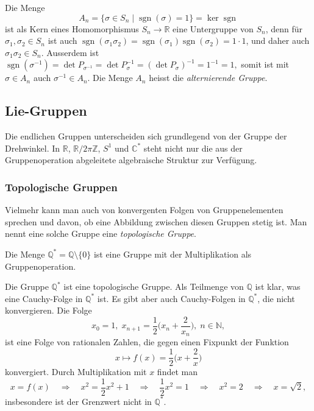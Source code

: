 Die Menge
\[
A_n
=
\{ \sigma\in S_n \mid \operatorname{sgn}(\sigma) = 1 \}
=
\ker
\operatorname{sgn}
\]
ist als Kern eines Homomorphismus $S_n\to\mathbb{R}$
eine Untergruppe von $S_n$, denn für $\sigma_1,\sigma_2\in S_n$ ist auch
\(
\operatorname{sgn}(\sigma_1\sigma_2)
=
\operatorname{sgn}(\sigma_1)
\operatorname{sgn}(\sigma_2)
=
1\cdot 1
\),
und daher auch $\sigma_1\sigma_2\in S_n$.
Ausserdem ist 
\(
\operatorname{sgn}(\sigma^{-1})=\det P_{\sigma^{-1}}
=
\det P_\sigma^{-1}
=
(\det P_\sigma)^{-1}
=
1^{-1}=1,
\)
somit ist mit $\sigma\in A_n$ auch $\sigma^{-1}\in A_n$.
Die Menge $A_n$ heisst die {\em alternierende Gruppe}.

%
%
\subsection{Lie-Gruppen
\label{buch:gruppen:subsection:lie-gruppen}}
Die endlichen Gruppen unterscheiden sich grundlegend von der Gruppe
der Drehwinkel.
In $\mathbb{R}$, $\mathbb{R}/2\pi\mathbb{Z}$, $S^1$ und $\mathbb{C}^*$
steht nicht nur die aus der Gruppenoperation abgeleitete algebraische
Struktur zur Verfügung.

%
%
\subsubsection{Topologische Gruppen}
Vielmehr kann man auch von konvergenten Folgen von Gruppenelementen
sprechen und davon, ob eine Abbildung zwischen diesen Gruppen
stetig ist.
Man nennt eine solche Gruppe eine {\em topologische Gruppe}.
%

\begin{beispiel}
Die Menge
\(
\mathbb{Q}^*
=
\mathbb{Q} \setminus\{0\}
\)
ist eine Gruppe mit der Multiplikation als Gruppenoperation.
\end{beispiel}

Die Gruppe $\mathbb{Q}^*$ ist eine topologische Gruppe.
Als Teilmenge von $\mathbb{Q}$ ist klar, was eine Cauchy-Folge in
$\mathbb{Q}^*$ ist.
Es gibt aber auch Cauchy-Folgen in $\mathbb{Q}^*$, die nicht konvergieren.
Die Folge
\[
x_0=1,\;
x_{n+1} = \frac12\biggl(x_n+\frac{2}{x_n}\biggr),\; n\in\mathbb{N},
\]
ist eine Folge von rationalen Zahlen, die gegen einen Fixpunkt der
Funktion
\[
x\mapsto f(x)=\frac12\biggl(x+\frac{2}{x}\biggr)
\]
konvergiert.
Durch Multiplikation mit $x$ findet man
\[
x=f(x)
\quad\Rightarrow\quad
x^2=\frac12 x^2 + 1
\quad\Rightarrow\quad
\frac12x^2=1
\quad\Rightarrow\quad
x^2=2
\quad\Rightarrow\quad
x=\!\sqrt{2},
\]
insbesondere ist der Grenzwert nicht in $\mathbb{Q}^*$.

